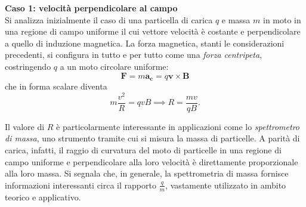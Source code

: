 \documentclass[a4paper,11pt]{report}
\begin{document}
\begin{approfondimento}[colback= white, colframe=green!35!black, no shadow, title={Moto di cariche in regioni di campo magnetico uniforme}]
\textbf{Caso 1: velocità perpendicolare al campo} \\
Si analizza inizialmente il caso di una particella di carica $q$ e massa $m$ in moto in una regione di campo uniforme il cui vettore velocità è costante e perpendicolare a quello di induzione magnetica. La forza magnetica, stanti le considerazioni precedenti, si configura in tutto e per tutto come una \textit{forza centripeta}, costringendo $q$ a un moto circolare uniforme:
\begin{equation}
    \bm{F} = m\bm{a_c} = q \bm{v} \times \bm{B}
\end{equation}
che in forma scalare diventa
\begin{equation}
    m\frac{v^2}{R} = q v  B \implies R = \frac{mv}{qB}.
\end{equation}

\begin{center}
    \end{center}

    Il valore di $R$ è particolarmente interessante in applicazioni come lo \textit{spettrometro di massa}, uno strumento tramite cui si misura la massa di particelle. A parità di carica, infatti, il raggio di curvatura del moto di particelle in una regione di campo uniforme e perpendicolare alla loro velocità è direttamente proporzionale alla loro massa. Si segnala che, in generale, la spettrometria di massa fornisce informazioni interessanti circa il rapporto $\frac{q}{m}$, vastamente utilizzato in ambito teorico e applicativo. \\
    

\end{approfondimento}
\end{document}
